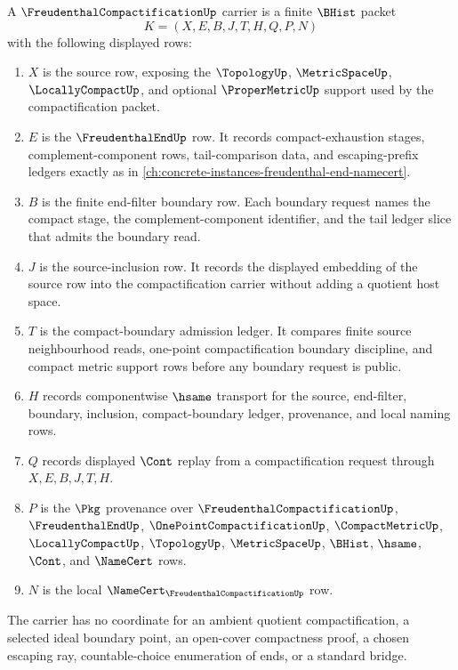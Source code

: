 \begin{definition}
\label{def:freudenthal-compactification-carrier}
A $\FreudenthalCompactificationUp$ carrier is a finite $\BHist$ packet
$$
K=(X,E,B,J,T,H,Q,P,N)
$$
with the following displayed rows:
\begin{enumerate}
\item $X$ is the source row, exposing the $\TopologyUp$, $\MetricSpaceUp$, $\LocallyCompactUp$, and optional $\ProperMetricUp$ support used by the compactification packet.
\item $E$ is the $\FreudenthalEndUp$ row. It records compact-exhaustion stages, complement-component rows, tail-comparison data, and escaping-prefix ledgers exactly as in \autoref{ch:concrete-instances-freudenthal-end-namecert}.
\item $B$ is the finite end-filter boundary row. Each boundary request names the compact stage, the complement-component identifier, and the tail ledger slice that admits the boundary read.
\item $J$ is the source-inclusion row. It records the displayed embedding of the source row into the compactification carrier without adding a quotient host space.
\item $T$ is the compact-boundary admission ledger. It compares finite source neighbourhood reads, one-point compactification boundary discipline, and compact metric support rows before any boundary request is public.
\item $H$ records componentwise $\hsame$ transport for the source, end-filter, boundary, inclusion, compact-boundary ledger, provenance, and local naming rows.
\item $Q$ records displayed $\Cont$ replay from a compactification request through $X,E,B,J,T,H$.
\item $P$ is the $\Pkg$ provenance over $\FreudenthalCompactificationUp$, $\FreudenthalEndUp$, $\OnePointCompactificationUp$, $\CompactMetricUp$, $\LocallyCompactUp$, $\TopologyUp$, $\MetricSpaceUp$, $\BHist$, $\hsame$, $\Cont$, and $\NameCert$ rows.
\item $N$ is the local $\NameCert_{\FreudenthalCompactificationUp}$ row.
\end{enumerate}
The carrier has no coordinate for an ambient quotient compactification, a selected ideal boundary point, an open-cover compactness proof, a chosen escaping ray, countable-choice enumeration of ends, or a standard bridge.
\end{definition}

